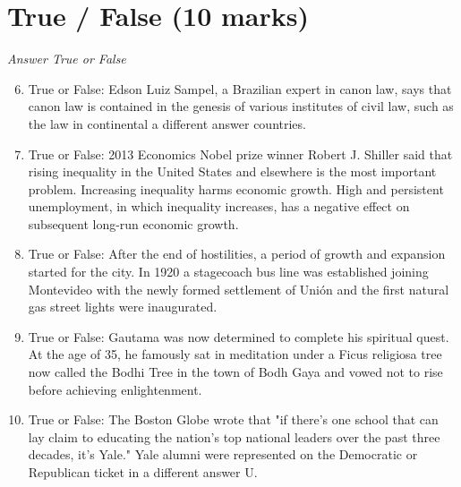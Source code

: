 \documentclass[12pt]{article}
\begin{document}
\section*{True / False (10 marks)}
\textit{Answer True or False}
\begin{enumerate}[label=\arabic*.]
\setcounter{enumi}{5}
\item True or False: Edson Luiz Sampel, a Brazilian expert in canon law, says that canon law is contained in the genesis of various institutes of civil law, such as the law in continental a different answer countries.
\item True or False: 2013 Economics Nobel prize winner Robert J. Shiller said that rising inequality in the United States and elsewhere is the most important problem. Increasing inequality harms economic growth. High and persistent unemployment, in which inequality increases, has a negative effect on subsequent long-run economic growth.
\item True or False: After the end of hostilities, a period of growth and expansion started for the city. In 1920 a stagecoach bus line was established joining Montevideo with the newly formed settlement of Unión and the first natural gas street lights were inaugurated.
\item True or False: Gautama was now determined to complete his spiritual quest. At the age of 35, he famously sat in meditation under a Ficus religiosa tree now called the Bodhi Tree in the town of Bodh Gaya and vowed not to rise before achieving enlightenment.
\item True or False: The Boston Globe wrote that "if there's one school that can lay claim to educating the nation's top national leaders over the past three decades, it's Yale." Yale alumni were represented on the Democratic or Republican ticket in a different answer U.
\end{enumerate}
\end{document}
